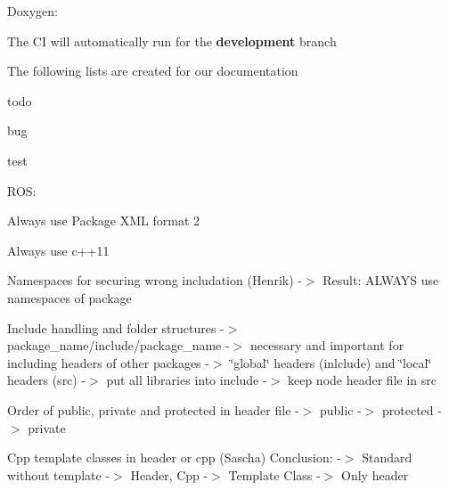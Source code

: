 \begin{DoxyEnumerate}
\item Doxygen\+:
\begin{DoxyItemize}
\item The CI will automatically run for the {\bfseries development} branch
\item The following lists are created for our documentation
\begin{DoxyItemize}
\item todo
\item bug
\item test
\end{DoxyItemize}
\end{DoxyItemize}
\end{DoxyEnumerate}
\begin{DoxyEnumerate}
\item R\+OS\+:
\begin{DoxyEnumerate}
\item Always use Package X\+ML format 2
\end{DoxyEnumerate}
\begin{DoxyEnumerate}
\item Always use c++11
\end{DoxyEnumerate}
\begin{DoxyEnumerate}
\item Namespaces for securing wrong includation (Henrik) -\/$>$ Result\+: A\+L\+W\+A\+YS use namespaces of package
\end{DoxyEnumerate}
\begin{DoxyEnumerate}
\item Include handling and folder structures -\/$>$ package\+\_\+name/include/package\+\_\+name -\/$>$ necessary and important for including headers of other packages -\/$>$ \char`\"{}global\char`\"{} headers (inlclude) and \char`\"{}local\char`\"{} headers (src) -\/$>$ put all libraries into include -\/$>$ keep node header file in src
\end{DoxyEnumerate}
\begin{DoxyEnumerate}
\item Order of public, private and protected in header file -\/$>$ public -\/$>$ protected -\/$>$ private
\end{DoxyEnumerate}
\begin{DoxyEnumerate}
\item Cpp template classes in header or cpp (Sascha) Conclusion\+: -\/$>$ Standard without template -\/$>$ Header, Cpp -\/$>$ Template Class -\/$>$ Only header
\begin{DoxyItemize}

\end{DoxyItemize}
\end{DoxyEnumerate}
\end{DoxyEnumerate}
